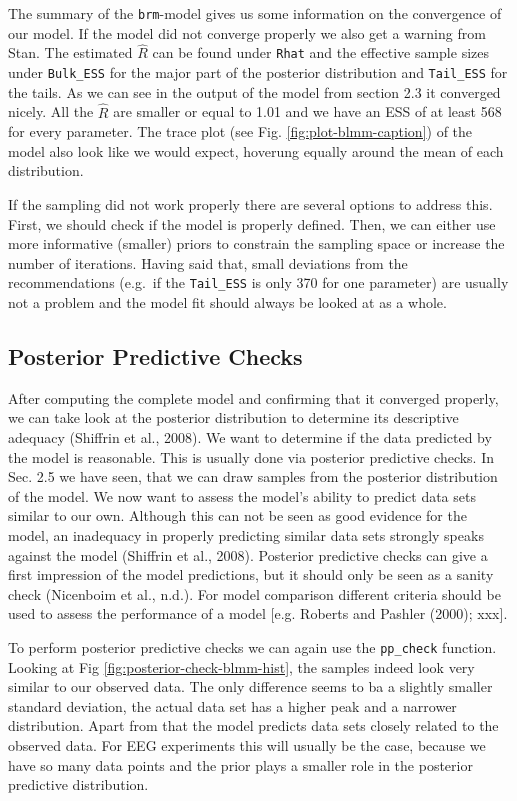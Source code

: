 \documentclass[
  doc,12pt,floatsintext]{apa7}
\begin{document}
The summary of the \texttt{brm}-model gives us some information on the convergence of our model. If the model did not converge properly we also get a warning from Stan. The estimated \(\hat{R}\) can be found under \texttt{Rhat} and the effective sample sizes under \texttt{Bulk\_ESS} for the major part of the posterior distribution and \texttt{Tail\_ESS} for the tails. As we can see in the output of the model from section 2.3 it converged nicely. All the \(\hat{R}\) are smaller or equal to 1.01 and we have an ESS of at least 568 for every parameter. The trace plot (see Fig. \ref{fig:plot-blmm-caption}) of the model also look like we would expect, hoverung equally around the mean of each distribution.

If the sampling did not work properly there are several options to address this. First, we should check if the model is properly defined. Then, we can either use more informative (smaller) priors to constrain the sampling space or increase the number of iterations. Having said that, small deviations from the recommendations (e.g.~if the \texttt{Tail\_ESS} is only 370 for one parameter) are usually not a problem and the model fit should always be looked at as a whole.

\subsection{Posterior Predictive Checks}\label{posterior-predictive-checks}

After computing the complete model and confirming that it converged properly, we can take look at the posterior distribution to determine its descriptive adequacy (Shiffrin et al., 2008). We want to determine if the data predicted by the model is reasonable. This is usually done via posterior predictive checks. In Sec. 2.5 we have seen, that we can draw samples from the posterior distribution of the model. We now want to assess the model's ability to predict data sets similar to our own. Although this can not be seen as good evidence for the model, an inadequacy in properly predicting similar data sets strongly speaks against the model (Shiffrin et al., 2008). Posterior predictive checks can give a first impression of the model predictions, but it should only be seen as a sanity check (Nicenboim et al., n.d.). For model comparison different criteria should be used to assess the performance of a model {[}e.g. Roberts and Pashler (2000); xxx{]}.

To perform posterior predictive checks we can again use the \texttt{pp\_check} function. Looking at Fig \ref{fig:posterior-check-blmm-hist}, the samples indeed look very similar to our observed data. The only difference seems to ba a slightly smaller standard deviation, the actual data set has a higher peak and a narrower distribution. Apart from that the model predicts data sets closely related to the observed data. For EEG experiments this will usually be the case, because we have so many data points and the prior plays a smaller role in the posterior predictive distribution.
\end{document}
